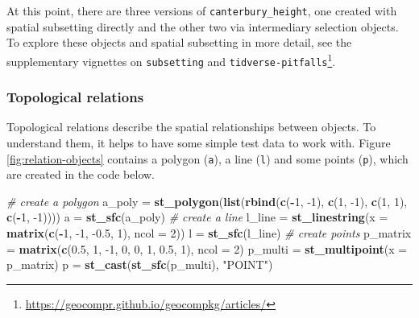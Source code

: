 \documentclass[]{krantz}
\newenvironment{Shaded}{\begin{snugshade}}{\end{snugshade}}
\newcommand{\CommentTok}[1]{\textcolor[rgb]{0.37,0.37,0.37}{\textit{#1}}}
\newcommand{\DataTypeTok}[1]{\textcolor[rgb]{0.27,0.27,0.27}{#1}}
\newcommand{\DecValTok}[1]{\textcolor[rgb]{0.06,0.06,0.06}{#1}}
\newcommand{\FloatTok}[1]{\textcolor[rgb]{0.06,0.06,0.06}{#1}}
\newcommand{\KeywordTok}[1]{\textcolor[rgb]{0.27,0.27,0.27}{\textbf{#1}}}
\newcommand{\NormalTok}[1]{#1}
\newcommand{\OperatorTok}[1]{\textcolor[rgb]{0.43,0.43,0.43}{\textbf{#1}}}
\newcommand{\StringTok}[1]{\textcolor[rgb]{0.5,0.5,0.5}{#1}}
\let\rmarkdownfootnote\footnote%
\def\footnote{\protect\rmarkdownfootnote}
\renewcommand{\href}[2]{#2\footnote{\url{#1}}}
\begin{document}
At this point, there are three versions of \texttt{canterbury\_height}, one created with spatial subsetting directly and the other two via intermediary selection objects.
To explore these objects and spatial subsetting in more detail, see the supplementary vignettes on \texttt{subsetting} and \href{https://geocompr.github.io/geocompkg/articles/}{\texttt{tidverse-pitfalls}}.

\hypertarget{topological-relations}{%
\subsubsection{Topological relations}\label{topological-relations}}

Topological relations describe the spatial relationships between objects.
To understand them, it helps to have some simple test data to work with.
Figure \ref{fig:relation-objects} contains a polygon (\texttt{a}), a line (\texttt{l}) and some points (\texttt{p}), which are created in the code below.

\begin{Shaded}
\begin{Highlighting}[]
\CommentTok{# create a polygon}
\NormalTok{a_poly =}\StringTok{ }\KeywordTok{st_polygon}\NormalTok{(}\KeywordTok{list}\NormalTok{(}\KeywordTok{rbind}\NormalTok{(}\KeywordTok{c}\NormalTok{(}\OperatorTok{-}\DecValTok{1}\NormalTok{, }\DecValTok{-1}\NormalTok{), }\KeywordTok{c}\NormalTok{(}\DecValTok{1}\NormalTok{, }\DecValTok{-1}\NormalTok{), }\KeywordTok{c}\NormalTok{(}\DecValTok{1}\NormalTok{, }\DecValTok{1}\NormalTok{), }\KeywordTok{c}\NormalTok{(}\OperatorTok{-}\DecValTok{1}\NormalTok{, }\DecValTok{-1}\NormalTok{))))}
\NormalTok{a =}\StringTok{ }\KeywordTok{st_sfc}\NormalTok{(a_poly)}
\CommentTok{# create a line}
\NormalTok{l_line =}\StringTok{ }\KeywordTok{st_linestring}\NormalTok{(}\DataTypeTok{x =} \KeywordTok{matrix}\NormalTok{(}\KeywordTok{c}\NormalTok{(}\OperatorTok{-}\DecValTok{1}\NormalTok{, }\DecValTok{-1}\NormalTok{, }\FloatTok{-0.5}\NormalTok{, }\DecValTok{1}\NormalTok{), }\DataTypeTok{ncol =} \DecValTok{2}\NormalTok{))}
\NormalTok{l =}\StringTok{ }\KeywordTok{st_sfc}\NormalTok{(l_line)}
\CommentTok{# create points}
\NormalTok{p_matrix =}\StringTok{ }\KeywordTok{matrix}\NormalTok{(}\KeywordTok{c}\NormalTok{(}\FloatTok{0.5}\NormalTok{, }\DecValTok{1}\NormalTok{, }\DecValTok{-1}\NormalTok{, }\DecValTok{0}\NormalTok{, }\DecValTok{0}\NormalTok{, }\DecValTok{1}\NormalTok{, }\FloatTok{0.5}\NormalTok{, }\DecValTok{1}\NormalTok{), }\DataTypeTok{ncol =} \DecValTok{2}\NormalTok{)}
\NormalTok{p_multi =}\StringTok{ }\KeywordTok{st_multipoint}\NormalTok{(}\DataTypeTok{x =}\NormalTok{ p_matrix)}
\NormalTok{p =}\StringTok{ }\KeywordTok{st_cast}\NormalTok{(}\KeywordTok{st_sfc}\NormalTok{(p_multi), }\StringTok{"POINT"}\NormalTok{)}
\end{Highlighting}
\end{Shaded}
\end{document}
